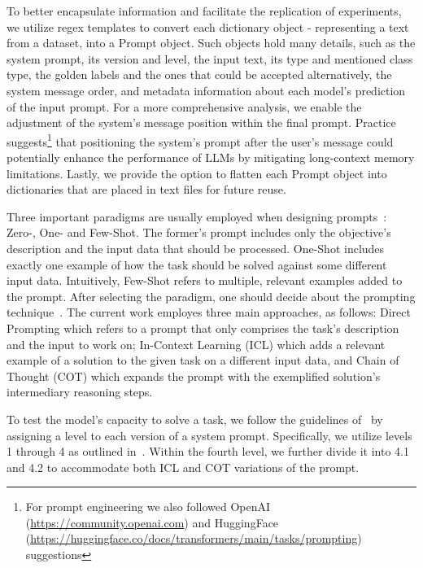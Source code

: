 \documentclass[runningheads]{llncs}
\begin{document}
To better encapsulate information and facilitate the replication of experiments, we utilize regex templates to convert each dictionary object - representing a text from a dataset, into a Prompt object. Such objects hold many details, such as the system prompt, its version and level, the input text, its type and  mentioned class type, the golden labels and the ones that could be accepted alternatively, the system message order, and metadata information about each model’s prediction of the input prompt. For a more comprehensive analysis, we enable the adjustment of the system's message position within the final prompt. Practice suggests\footnote{For prompt engineering we also followed OpenAI (\url{https://community.openai.com}) and HuggingFace (\url{https://huggingface.co/docs/transformers/main/tasks/prompting}) suggestions} that positioning the system's prompt after the user’s message could potentially enhance the performance of LLMs by mitigating long-context memory limitations. Lastly, we provide the option to flatten each Prompt object into dictionaries that are placed in text files for future reuse.

Three important paradigms are usually employed when designing prompts~\cite{zhao2023}: Zero-, One- and Few-Shot. The former’s prompt includes only the objective’s description and the input data that should be processed. One-Shot includes exactly one example of how the task should be solved against some different input data. Intuitively, Few-Shot refers to multiple, relevant examples added to the prompt.
After selecting the paradigm, one should decide about the prompting technique~\cite{zhao2023}. The current work employes three main approaches, as follows: Direct Prompting which refers to a prompt that only comprises the task’s description and the input to work on; In-Context Learning (ICL) which adds a relevant example of a solution to the given task on a different input data, and Chain of Thought (COT) which expands the prompt with the exemplified solution’s intermediary reasoning steps.

To test the model’s capacity to solve a task, we follow the guidelines of~\cite{teler2023} by assigning a level to each version of a system prompt. Specifically, we utilize levels 1 through 4 as outlined in~\cite{teler2023}. Within the fourth level, we further divide it into 4.1 and 4.2 to accommodate both ICL and COT variations of the prompt.
\end{document}
